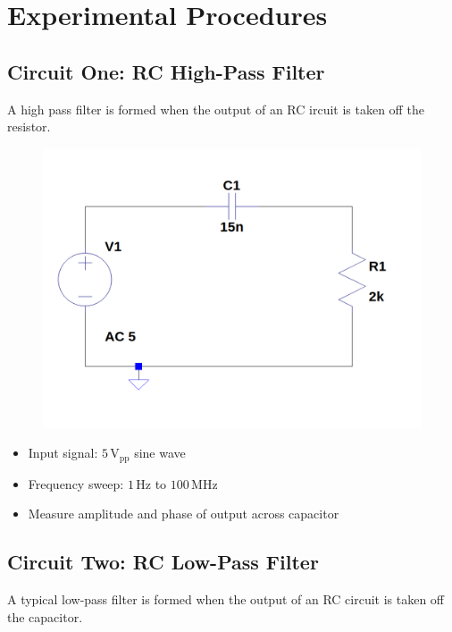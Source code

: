 \documentclass[12pt]{article}
\begin{document}
\section{Experimental Procedures}
\subsection{Circuit One: RC High-Pass Filter}
A high pass filter is formed when the output of an RC ircuit is taken off the
resistor. 
\begin{figure}[H]
	\includegraphics[width=\textwidth]{e6_01}
\end{figure}

\begin{itemize}
	\item Input signal: $5\,\mathrm{V_{pp}}$ sine wave
	\item Frequency sweep: $1\,\mathrm{Hz}$ to $100\,\mathrm{MHz}$
	\item Measure amplitude and phase of output across capacitor
\end{itemize}

\subsection{Circuit Two: RC Low-Pass Filter}
A typical low-pass filter is formed when the output of an RC circuit is taken
off the capacitor.
\end{document}
